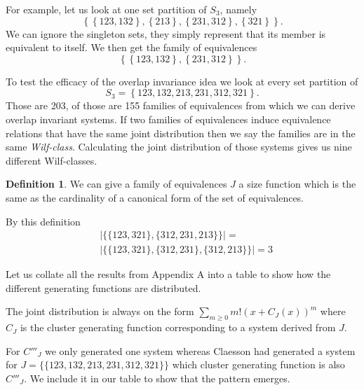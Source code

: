 \documentclass[a4paper, 11pt, english]{article}
\theoremstyle{definition}
\newtheorem{definition}[theorem]{Definition}
\newcommand{\Sym}{S}
\begin{document}
For example, let us look at one set partition of $\Sym_3$, namely 
\[
  \left\{ \left\{ 123, 132 \right\}, \left\{ 213 \right\}, \left\{ 231, 312 \right\}, \left\{ 321
  \right\} \right\}.
\]
We can ignore the singleton sets, they simply represent that its member is equivalent to itself. We
then get the family of equivalences
\[
  \left\{ \left\{ 123, 132 \right\}, \left\{ 231, 312 \right\} \right\}.
\]

To test the efficacy of the overlap invariance idea we look at every set partition of 
\[
  \Sym_3 = \left\{ 123, 132, 213, 231, 312, 321 \right\}.
\]
Those are 203, of those are 155 families of equivalences from which we can derive overlap
invariant systems.
If two families of equivalences induce equivalence relations that have the same joint distribution
then we say the families are in the same \emph{Wilf-class}.
Calculating the joint distribution of those systems gives us nine different Wilf-classes.

\begin{definition}
    We can give a family of equivalences $J$ a size function which is the same
    as the cardinality of a canonical form of the set of equivalences.

    By this definition 
    \begin{align*}
      & | \{ \{ 123, 321 \}, \{ 312, 231, 213 \} \}| =  \\
      & | \{ \{ 123, 321 \}, \{ 312, 231 \}, \{ 312, 213 \} \} | =  3
    \end{align*}
\end{definition}

Let us collate all the results from Appendix A into a table to show how the
different generating functions are distributed.

The joint distribution is always on the form $\sum_{m \geq 0}m!(x+C_J(x))^m$ where $C_J$
is the cluster generating function corresponding to a system derived from $J$.

For $C'''_J$ we only generated one system whereas Claesson had generated a system for
$J = \{\{ 123, 132, 213, 231, 312, 321 \}\}$ which cluster generating function
is also $C'''_J$. We include it in our table to show that the pattern emerges.
\end{document}
